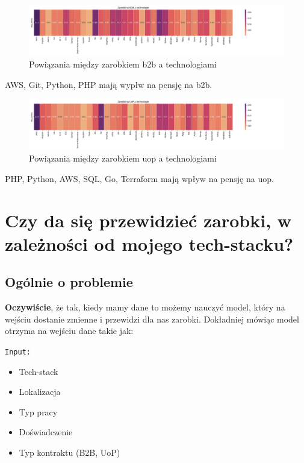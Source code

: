 \documentclass[a4paper]{article}
\begin{document}
\begin{figure}[H]
    \centering
    \includegraphics[width=\textwidth]{../analysis/plots/korelacje/zarobki_na_b2b_a_technologie.png}
    \caption{Powiązania między zarobkiem b2b a technologiami}
\end{figure}

\quad AWS, Git, Python, PHP mają wypłw na pensję na b2b.

\begin{figure}[H]
    \centering
    \includegraphics[width=\textwidth]{../analysis/plots/korelacje/zarobki_na_uop_a_technologie.png}
    \caption{Powiązania między zarobkiem uop a technologiami}
\end{figure}

\quad PHP, Python, AWS, SQL, Go, Terraform mają wpływ na pensję na uop.


\section{Czy da się przewidzieć zarobki, w zależności od mojego tech-stacku?}

\subsection{Ogólnie o problemie}

\quad \textbf{Oczywiście}, że tak, kiedy mamy dane to możemy nauczyć model, który na wejściu dostanie zmienne i przewidzi dla nas
zarobki. Dokładniej mówiąc model otrzyma na wejściu dane takie jak:

\texttt{Input:}

\begin{itemize}
    \item Tech-stack
    \item Lokalizacja
    \item Typ pracy
    \item Doświadczenie
    \item Typ kontraktu (B2B, UoP)
\end{itemize}
\end{document}
